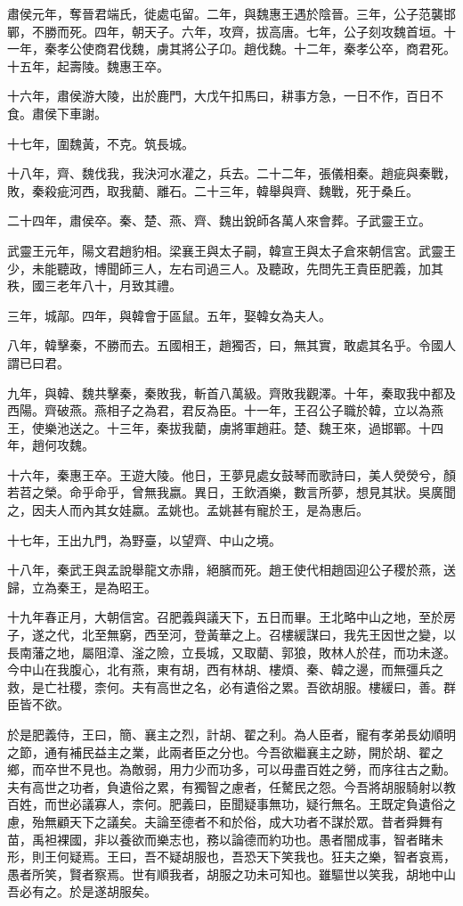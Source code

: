 肅侯元年，奪晉君端氏，徙處屯留。二年，與魏惠王遇於陰晉。三年，公子范襲邯鄲，不勝而死。四年，朝天子。六年，攻齊，拔高唐。七年，公子刻攻魏首垣。十一年，秦孝公使商君伐魏，虜其將公子卬。趙伐魏。十二年，秦孝公卒，商君死。十五年，起壽陵。魏惠王卒。

十六年，肅侯游大陵，出於鹿門，大戊午扣馬曰，耕事方急，一日不作，百日不食。肅侯下車謝。

十七年，圍魏黃，不克。筑長城。

十八年，齊、魏伐我，我決河水灌之，兵去。二十二年，張儀相秦。趙疵與秦戰，敗，秦殺疵河西，取我藺、離石。二十三年，韓舉與齊、魏戰，死于桑丘。

二十四年，肅侯卒。秦、楚、燕、齊、魏出銳師各萬人來會葬。子武靈王立。

武靈王元年，陽文君趙豹相。梁襄王與太子嗣，韓宣王與太子倉來朝信宮。武靈王少，未能聽政，博聞師三人，左右司過三人。及聽政，先問先王貴臣肥義，加其秩，國三老年八十，月致其禮。

三年，城鄗。四年，與韓會于區鼠。五年，娶韓女為夫人。

八年，韓擊秦，不勝而去。五國相王，趙獨否，曰，無其實，敢處其名乎。令國人謂已曰君。

九年，與韓、魏共擊秦，秦敗我，斬首八萬級。齊敗我觀澤。十年，秦取我中都及西陽。齊破燕。燕相子之為君，君反為臣。十一年，王召公子職於韓，立以為燕王，使樂池送之。十三年，秦拔我藺，虜將軍趙莊。楚、魏王來，過邯鄲。十四年，趙何攻魏。

十六年，秦惠王卒。王遊大陵。他日，王夢見處女鼓琴而歌詩曰，美人熒熒兮，顏若苕之榮。命乎命乎，曾無我嬴。異日，王飲酒樂，數言所夢，想見其狀。吳廣聞之，因夫人而內其女娃嬴。孟姚也。孟姚甚有寵於王，是為惠后。

十七年，王出九門，為野臺，以望齊、中山之境。

十八年，秦武王與孟說舉龍文赤鼎，絕臏而死。趙王使代相趙固迎公子稷於燕，送歸，立為秦王，是為昭王。

十九年春正月，大朝信宮。召肥義與議天下，五日而畢。王北略中山之地，至於房子，遂之代，北至無窮，西至河，登黃華之上。召樓緩謀曰，我先王因世之變，以長南藩之地，屬阻漳、滏之險，立長城，又取藺、郭狼，敗林人於荏，而功未遂。今中山在我腹心，北有燕，東有胡，西有林胡、樓煩、秦、韓之邊，而無彊兵之救，是亡社稷，柰何。夫有高世之名，必有遺俗之累。吾欲胡服。樓緩曰，善。群臣皆不欲。

於是肥義侍，王曰，簡、襄主之烈，計胡、翟之利。為人臣者，寵有孝弟長幼順明之節，通有補民益主之業，此兩者臣之分也。今吾欲繼襄主之跡，開於胡、翟之鄉，而卒世不見也。為敵弱，用力少而功多，可以毋盡百姓之勞，而序往古之勳。夫有高世之功者，負遺俗之累，有獨智之慮者，任驁民之怨。今吾將胡服騎射以教百姓，而世必議寡人，柰何。肥義曰，臣聞疑事無功，疑行無名。王既定負遺俗之慮，殆無顧天下之議矣。夫論至德者不和於俗，成大功者不謀於眾。昔者舜舞有苗，禹袒裸國，非以養欲而樂志也，務以論德而約功也。愚者闇成事，智者睹未形，則王何疑焉。王曰，吾不疑胡服也，吾恐天下笑我也。狂夫之樂，智者哀焉，愚者所笑，賢者察焉。世有順我者，胡服之功未可知也。雖驅世以笑我，胡地中山吾必有之。於是遂胡服矣。

